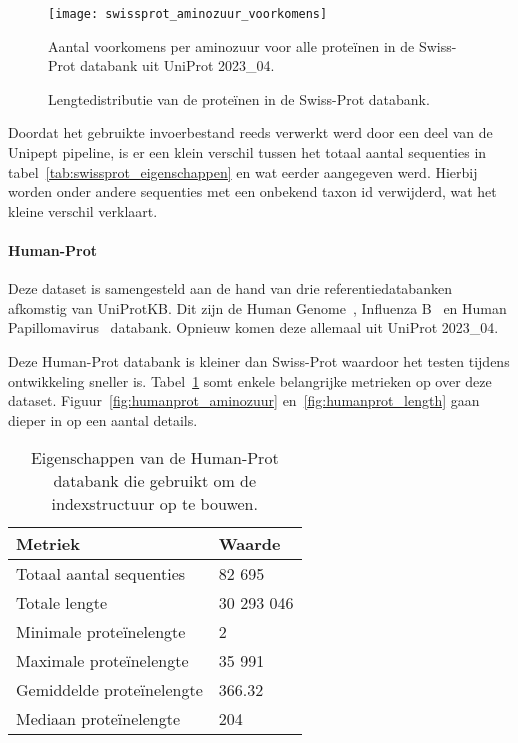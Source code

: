 \begin{figure}[H]
    \centering
    \texttt{[image: swissprot\_aminozuur\_voorkomens]}
    \caption{Aantal voorkomens per aminozuur voor alle proteïnen in de Swiss-Prot databank uit UniProt 2023\_04.}
    \label{fig:swissprot_aminozuur}
\end{figure}

\begin{figure}[H]
    \centering
    \hfill
    \caption{Lengtedistributie van de proteïnen in de Swiss-Prot databank.}\label{fig:swissprot_length}
\end{figure}

Doordat het gebruikte invoerbestand reeds verwerkt werd door een deel van de Unipept pipeline, is er een klein verschil tussen het totaal aantal sequenties in tabel~\ref{tab:swissprot_eigenschappen} en wat eerder aangegeven werd.
Hierbij worden onder andere sequenties met een onbekend taxon id verwijderd, wat het kleine verschil verklaart.

\paragraph{Human-Prot} Deze dataset is samengesteld aan de hand van drie referentiedatabanken afkomstig van UniProtKB\@.
Dit zijn de Human Genome~\cite{proteomes_homo_sapiens}, Influenza B~\cite{proteomes_infuenza_b} en Human Papillomavirus~\cite{proteomes_human_papillomavirus} databank.
Opnieuw komen deze allemaal uit UniProt 2023\_04.

Deze Human-Prot databank is kleiner dan Swiss-Prot waardoor het testen tijdens ontwikkeling sneller is.
Tabel~\ref{tab:humanprot_eigenschappen} somt enkele belangrijke metrieken op over deze dataset.
Figuur~\ref{fig:humanprot_aminozuur} en~\ref{fig:humanprot_length} gaan dieper in op een aantal details.

\begin{table}[h!]
    \centering
    \begin{tabular}{ l l }
        Metriek                   & Waarde     \\
        \hline\hline
        Totaal aantal sequenties  & 82 695     \\
        Totale lengte             & 30 293 046 \\
        Minimale proteïnelengte   & 2          \\
        Maximale proteïnelengte   & 35 991     \\
        Gemiddelde proteïnelengte & 366.32     \\
        Mediaan proteïnelengte    & 204        \\
        \hline
    \end{tabular}
    \caption{Eigenschappen van de Human-Prot databank die gebruikt om de indexstructuur op te bouwen.}
    \label{tab:humanprot_eigenschappen}
\end{table}

